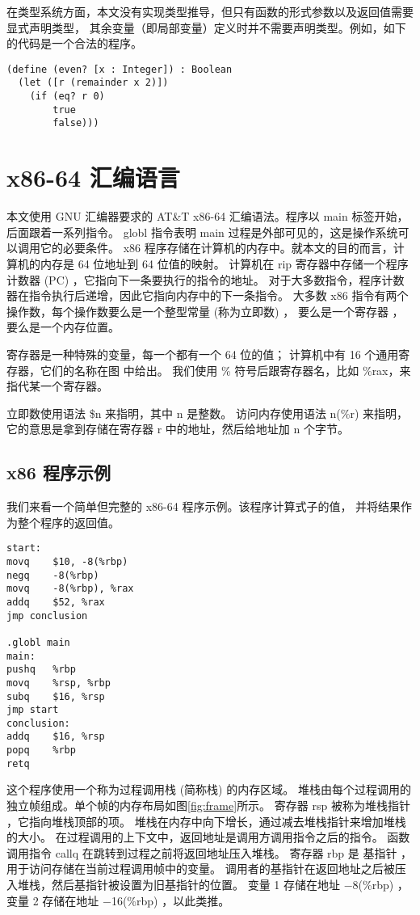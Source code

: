 在类型系统方面，本文没有实现类型推导，但只有函数的形式参数以及返回值需要显式声明类型，
其余变量（即局部变量）定义时并不需要声明类型。例如，如下的代码是一个合法的程序。
\begin{lstlisting}
(define (even? [x : Integer]) : Boolean
  (let ([r (remainder x 2)])
    (if (eq? r 0)
        true
        false)))
\end{lstlisting}

\section{x86-64 汇编语言}

本文使用 GNU 汇编器要求的 AT\&T x86-64 汇编语法。程序以 main 标签开始，后面跟着一系列指令。
globl 指令表明 main 过程是外部可见的，这是操作系统可以调用它的必要条件。
x86 程序存储在计算机的内存中。就本文的目的而言，计算机的内存是 64 位地址到 64 位值的映射。
计算机在 rip 寄存器中存储一个程序计数器 (PC) ，它指向下一条要执行的指令的地址。
对于大多数指令，程序计数器在指令执行后递增，因此它指向内存中的下一条指令。
大多数 x86 指令有两个操作数，每个操作数要么是一个整型常量 (称为立即数) ，
要么是一个寄存器 ，要么是一个内存位置。

寄存器是一种特殊的变量，每一个都有一个 64 位的值；
计算机中有 16 个通用寄存器，它们的名称在图
中给出。
我们使用 \% 符号后跟寄存器名，比如 \%rax，来指代某一个寄存器。

立即数使用语法 \$n 来指明，其中 n 是整数。
访问内存使用语法 n(\%r) 来指明，它的意思是拿到存储在寄存器 r 中的地址，然后给地址加 n 个字节。

\subsection{x86 程序示例}

我们来看一个简单但完整的 x86-64 程序示例。该程序计算式子的值，
并将结果作为整个程序的返回值。

\begin{lstlisting}
start:
movq	$10, -8(%rbp)
negq	-8(%rbp)
movq	-8(%rbp), %rax
addq	$52, %rax
jmp conclusion

.globl main
main:
pushq	%rbp
movq	%rsp, %rbp
subq	$16, %rsp
jmp start
conclusion:
addq	$16, %rsp
popq	%rbp
retq
\end{lstlisting}

这个程序使用一个称为过程调用栈 (简称栈) 的内存区域。
堆栈由每个过程调用的独立帧组成。单个帧的内存布局如图\ref{fig:frame}所示。
寄存器 rsp 被称为堆栈指针 ，它指向堆栈顶部的项。
堆栈在内存中向下增长，通过减去堆栈指针来增加堆栈的大小。
在过程调用的上下文中，返回地址是调用方调用指令之后的指令。
函数调用指令 callq 在跳转到过程之前将返回地址压入堆栈。
寄存器 rbp 是 基指针 ，用于访问存储在当前过程调用帧中的变量。
调用者的基指针在返回地址之后被压入堆栈，然后基指针被设置为旧基指针的位置。
变量 1 存储在地址 −8(\%rbp) ，变量 2 存储在地址 −16(\%rbp) ，以此类推。

